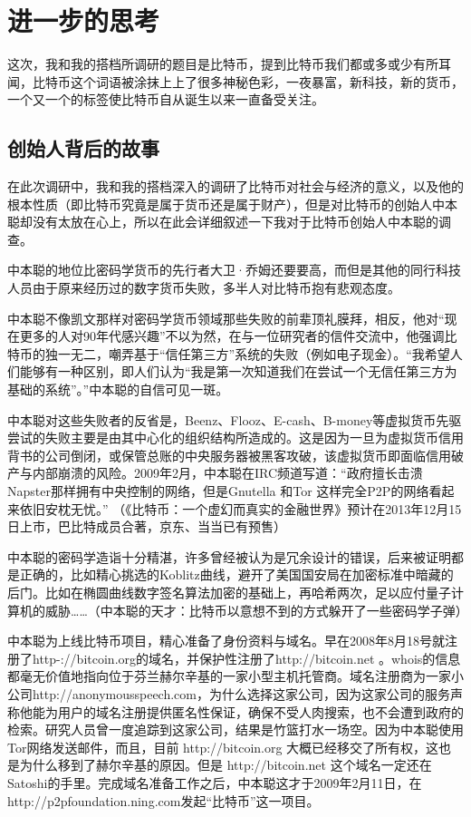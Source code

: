 \documentclass{article}
\begin{document}
\section{进一步的思考}

	这次，我和我的搭档所调研的题目是比特币，提到比特币我们都或多或少有所耳闻，比特币这个词语被涂抹上上了很多神秘色彩，一夜暴富，新科技，新的货币，一个又一个的标签使比特币自从诞生以来一直备受关注。\par
	\subsection{创始人背后的故事}
	 在此次调研中，我和我的搭档深入的调研了比特币对社会与经济的意义，以及他的根本性质（即比特币究竟是属于货币还是属于财产），但是对比特币的创始人中本聪却没有太放在心上，所以在此会详细叙述一下我对于比特币创始人中本聪的调查。\par
	中本聪的地位比密码学货币的先行者大卫·乔姆还要要高，而但是其他的同行科技人员由于原来经历过的数字货币失败，多半人对比特币抱有悲观态度。\par
	中本聪不像凯文那样对密码学货币领域那些失败的前辈顶礼膜拜，相反，他对“现在更多的人对90年代感兴趣”不以为然，在与一位研究者的信件交流中，他强调比特币的独一无二，嘲弄基于“信任第三方”系统的失败（例如电子现金）。“我希望人们能够有一种区别，即人们认为“我是第一次知道我们在尝试一个无信任第三方为基础的系统”。”中本聪的自信可见一斑。\par
	中本聪对这些失败者的反省是，Beenz、Flooz、E-cash、B-money等虚拟货币先驱尝试的失败主要是由其中心化的组织结构所造成的。这是因为一旦为虚拟货币信用背书的公司倒闭，或保管总账的中央服务器被黑客攻破，该虚拟货币即面临信用破产与内部崩溃的风险。2009年2月，中本聪在IRC频道写道：“政府擅长击溃Napster那样拥有中央控制的网络，但是Gnutella 和Tor 这样完全P2P的网络看起来依旧安枕无忧。” （《比特币：一个虚幻而真实的金融世界》预计在2013年12月15日上市，巴比特成员合著，京东、当当已有预售）\par
	中本聪的密码学造诣十分精湛，许多曾经被认为是冗余设计的错误，后来被证明都是正确的，比如精心挑选的Koblitz曲线，避开了美国国安局在加密标准中暗藏的后门。比如在椭圆曲线数字签名算法加密的基础上，再哈希两次，足以应付量子计算机的威胁……（中本聪的天才：比特币以意想不到的方式躲开了一些密码学子弹）\par
	中本聪为上线比特币项目，精心准备了身份资料与域名。早在2008年8月18号就注册了http-://bitcoin.org的域名，并保护性注册了http://bitcoin.net 。whois的信息都毫无价值地指向位于芬兰赫尔辛基的一家小型主机托管商。域名注册商为一家小公司http://anonymousspeech.com，为什么选择这家公司，因为这家公司的服务声称他能为用户的域名注册提供匿名性保证，确保不受人肉搜索，也不会遭到政府的检索。研究人员曾一度追踪到这家公司，结果是竹篮打水一场空。因为中本聪使用Tor网络发送邮件，而且，目前 http://bitcoin.org 大概已经移交了所有权，这也是为什么移到了赫尔辛基的原因。但是 http://bitcoin.net 这个域名一定还在Satoshi的手里。完成域名准备工作之后，中本聪这才于2009年2月11日，在http://p2pfoundation.ning.com发起“比特币”这一项目。\par
\end{document}
